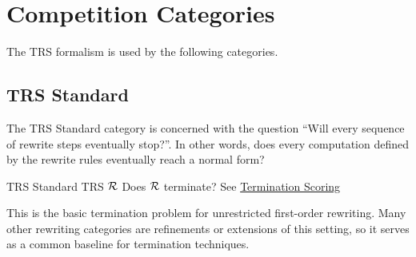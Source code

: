 \section{Competition Categories}

The TRS formalism is used by the following categories.

\subsection{TRS Standard}

The TRS Standard category is concerned with the question 
``Will every sequence of rewrite steps eventually stop?''. 
In other words, does every computation defined by the rewrite rules eventually reach a normal form? 

\begin{formalproblem}
  {TRS Standard}
  {TRS $\mathcal{R}$}
  {Does $\mathcal{R}$ terminate?}
  {See \hyperref[scoring_termination]{Termination Scoring}}
\end{formalproblem}

\begin{motivation}
This is the basic termination problem for unrestricted first-order rewriting.
Many other rewriting categories are refinements or extensions of this setting, so it serves as a common baseline for termination techniques.
\end{motivation}

